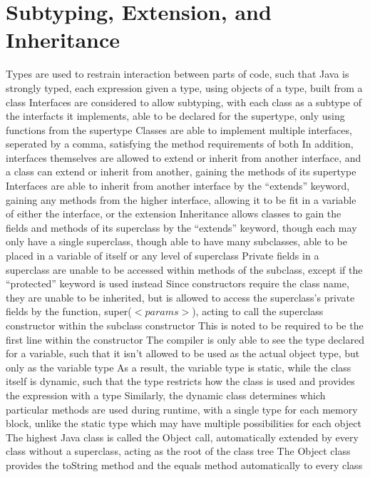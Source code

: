\documentclass[11 pt, twoside]{article}
\newenvironment{outline*}
{
	\begin{outline}[enumerate]
	}
	{\end{outline}
}
\begin{document}
\section{Subtyping, Extension, and Inheritance}
\begin{outline*}
\1 Types are used to restrain interaction between parts of code, such that Java is strongly typed, each expression given a type, using objects of a type, built from a class
	\2 Interfaces are considered to allow subtyping, with each class as a subtype of the interfacts it implements, able to be declared for the supertype, only using functions from the supertype
	\2 Classes are able to implement multiple interfaces, seperated by a comma, satisfying the method requirements of both
		\3 In addition, interfaces themselves are allowed to extend or inherit from another interface, and a class can extend or inherit from another, gaining the methods of its supertype
			\4 Interfaces are able to inherit from another interface by the ``extends'' keyword, gaining any methods from the higher interface, allowing it to be fit in a variable of either the interface, or the extension
			\4 Inheritance allows classes to gain the fields and methods of its superclass by the ``extends'' keyword, though each may only have a single superclass, though able to have many subclasses, able to be placed in a variable of itself or any level of superclass
			\4 Private fields in a superclass are unable to be accessed within methods of the subclass, except if the ``protected'' keyword is used instead
		\3 Since constructors require the class name, they are unable to be inherited, but is allowed to access the superclass's private fields by the function, super($<params>$), acting to call the superclass constructor within the subclass constructor
			\4 This is noted to be required to be the first line within the constructor
	\2 The compiler is only able to see the type declared for a variable, such that it isn't allowed to be used as the actual object type, but only as the variable type
		\3 As a result, the variable type is static, while the class itself is dynamic, such that the type restricts how the class is used and provides the expression with a type
		\3 Similarly, the dynamic class determines which particular methods are used during runtime, with a single type for each memory block, unlike the static type which may have multiple possibilities for each object
\1 The highest Java class is called the Object call, automatically extended by every class without a superclass, acting as the root of the class tree
	\2 The Object class provides the toString method and the equals method automatically to every class
\end{outline*}
\end{document}
